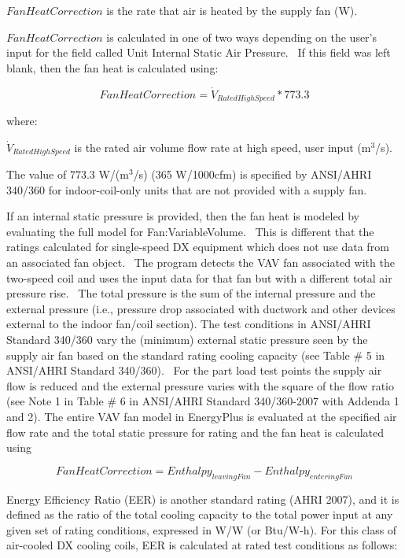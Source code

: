 \(FanHeatCorrection\) is the rate that air is heated by the supply fan (W).

\(FanHeatCorrection\) is calculated in one of two ways depending on the user's input for the field called Unit Internal Static Air Pressure.~ If this field was left blank, then the fan heat is calculated using:

\begin{equation}
FanHeatCorrection = {\dot V_{RatedHighSpeed}}*773.3
\end{equation}

where:

\({\dot V_{RatedHighSpeed}}\) is the rated air volume flow rate at high speed, user input (m\(^{3}\)/s).

The value of 773.3 W/(m\(^{3}\)/s) (365 W/1000cfm) is specified by ANSI/AHRI 340/360 for indoor-coil-only units that are not provided with a supply fan.

If an internal static pressure is provided, then the fan heat is modeled by evaluating the full model for Fan:VariableVolume.~ This is different that the ratings calculated for single-speed DX equipment which does not use data from an associated fan object.~ The program detects the VAV fan associated with the two-speed coil and uses the input data for that fan but with a different total air pressure rise.~ The total pressure is the sum of the internal pressure and the external pressure (i.e., pressure drop associated with ductwork and other devices external to the indoor fan/coil section). The test conditions in ANSI/AHRI Standard 340/360 vary the (minimum) external static pressure seen by the supply air fan based on the standard rating cooling capacity (see Table \# 5 in ANSI/AHRI Standard 340/360).~ For the part load test points the supply air flow is reduced and the external pressure varies with the square of the flow ratio (see Note 1 in Table \# 6 in ANSI/AHRI Standard 340/360-2007 with Addenda 1 and 2). The entire VAV fan model in EnergyPlus is evaluated at the specified air flow rate and the total static pressure for rating and the fan heat is calculated using

\begin{equation}
FanHeatCorrection = Enthalp{y_{leavingFan}} - Enthalp{y_{enteringFan}}
\end{equation}

Energy Efficiency Ratio (EER) is another standard rating (AHRI 2007), and it is defined as the ratio of the total cooling capacity to the total power input at any given set of rating conditions, expressed in W/W (or Btu/W-h). For this class of air-cooled DX cooling coils, EER is calculated at rated test conditions as follows:

